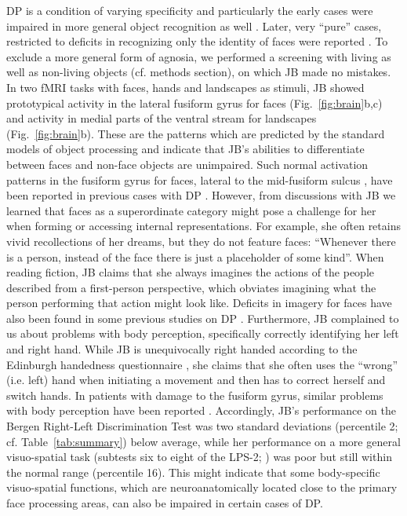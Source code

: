 \documentclass[fleqn,10pt]{SelfArx} %
\begin{document}
DP is a condition of varying specificity and particularly the early cases were impaired in more general object recognition as well \citep{McConachie_1976, Ariel_1996}. Later, very “pure” cases, restricted to deficits in recognizing only the identity of faces were reported \citep{Nunn_2001, Bentin_1999, Duchaine_2005}. To exclude a more general form of agnosia, we performed a screening with living as well as non-living objects (cf. methods section), on which JB made no mistakes. In two fMRI tasks with faces, hands and landscapes as stimuli, JB showed prototypical activity in the lateral fusiform gyrus for faces (Fig.~\ref{fig:brain}b,c) and activity in medial parts of the ventral stream for landscapes (Fig.~\ref{fig:brain}b). These are the patterns which are predicted by the standard models of object processing \citep{Grill_Spector_2014} and indicate that JB's abilities to differentiate between faces and non-face objects are unimpaired. Such normal activation patterns in the fusiform gyrus for faces, lateral to the mid-fusiform sulcus \citep{Weiner_2014}, have been reported in previous cases with DP \citep{Hasson_2003, Avidan_2005, Furl_2011}. However, from discussions with JB we learned that faces as a superordinate category might pose a challenge for her when forming or accessing internal representations. For example, she often retains vivid recollections of her dreams, but they do not feature faces: “Whenever there is a person, instead of the face there is just a placeholder of some kind”. When reading fiction, JB claims that she always imagines the actions of the people described from a first-person perspective, which obviates imagining what the person performing that action might look like. Deficits in imagery for faces have also been found in some previous studies on DP \citep{Gr_ter_2009, Tree_2010}.
Furthermore, JB complained to us about problems with body perception, specifically correctly identifying her left and right hand. While JB is unequivocally right handed according to the Edinburgh handedness questionnaire \citep{Oldfield_1971}, she claims that she often uses the “wrong” (i.e. left) hand when initiating a movement and then has to correct herself and switch hands. In patients with damage to the fusiform gyrus, similar problems with body perception have been reported \citep{Grewe_2014}. Accordingly, JB's performance on the Bergen Right-Left Discrimination Test \citep{Ofte_2002} was two standard deviations (percentile 2; cf. Table~\ref{tab:summary}) below average, while her performance on a more general visuo-spatial task (subtests six to eight of the LPS-2; \citet{Horn}) was poor but still within the normal range (percentile 16). This might indicate that some body-specific visuo-spatial functions, which are neuroanatomically located close to the primary face processing areas, can also be impaired in certain cases of DP.
\end{document}
